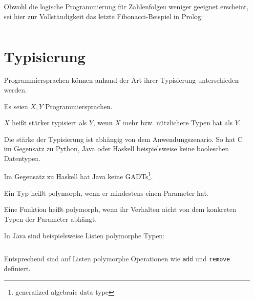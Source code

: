 \begin{beispiel}
    Obwohl die logische Programmierung für Zahlenfolgen weniger geeignet erscheint,
    sei hier zur Vollständigkeit das letzte Fibonacci-Beispiel in Prolog:
    \inputminted[numbersep=5pt, tabsize=4]{prolog}{scripts/prolog/fibonacci.pl}
\end{beispiel}

\section{Typisierung}
Programmiersprachen können anhand der Art ihrer Typisierung unterschieden werden.

\begin{definition}[Typisierungsstärke]%
    Es seien $X, Y$ Programmiersprachen.

    $X$ heißt stärker typisiert als $Y$, wenn $X$ mehr bzw. nützlichere Typen hat als $Y$.
\end{definition}

\begin{beispiel}[Typisierungsstärke]
    Die stärke der Typisierung ist abhängig von dem Anwendungszenario. So hat C im 
    Gegensatz zu Python, Java oder Haskell beispielsweise keine booleschen Datentypen.

    Im Gegensatz zu Haskell hat Java keine GADTs\footnote{generalized algebraic data type}.
\end{beispiel}

\begin{definition}[Polymorphie]%
    \begin{defenum}
        \item Ein Typ heißt polymorph, wenn er mindestens einen Parameter hat.
        \item Eine Funktion heißt polymorph, wenn ihr Verhalten nicht von dem
              konkreten Typen der Parameter abhängt.
    \end{defenum}
\end{definition}

\begin{beispiel}[Polymorphie]
    In Java sind beispielsweise Listen polymorphe Typen:

    \inputminted[numbersep=5pt, tabsize=4]{java}{scripts/java/list-example.java}

    Entsprechend sind auf Listen polymorphe Operationen wie \texttt{add} und
    \texttt{remove} definiert.
\end{beispiel}

